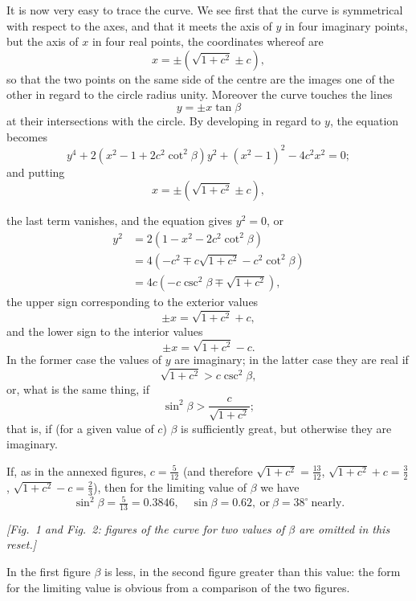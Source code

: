 \documentclass[11pt,a4paper]{article}
\theoremstyle{plain}
\begin{document}
It is now very easy to trace the curve. We see first that the curve is symmetrical with respect to the axes, and that it meets the axis of $y$ in four imaginary points, but the axis of $x$ in four real points, the coordinates whereof are
\[
x = \pm(\sqrt{1 + c^2} \pm c),
\]
so that the two points on the same side of the centre are the images one of the other in regard to the circle radius unity. Moreover the curve touches the lines
\[
y = \pm x\tan\beta
\]
at their intersections with the circle. By developing in regard to $y$, the equation becomes
\[
y^4 + 2(x^2 - 1 + 2c^2\cot^2\beta)y^2 + (x^2 - 1)^2 - 4c^2 x^2 = 0;
\]
and putting
\[
x = \pm(\sqrt{1 + c^2} \pm c),
\]

\newpage
\noindent the last term vanishes, and the equation gives $y^2 = 0$, or
\begin{align*}
y^2 &= 2(1 - x^2 - 2c^2\cot^2\beta) \\
    &= 4(-c^2 \mp c\sqrt{1 + c^2} - c^2\cot^2\beta) \\
    &= 4c(-c\csc^2\beta \mp \sqrt{1 + c^2}),
\end{align*}
the upper sign corresponding to the exterior values
\[
\pm x = \sqrt{1 + c^2} + c,
\]
and the lower sign to the interior values
\[
\pm x = \sqrt{1 + c^2} - c.
\]
In the former case the values of $y$ are imaginary; in the latter case they are real if
\[
\sqrt{1 + c^2} > c\csc^2\beta,
\]
or, what is the same thing, if
\[
\sin^2\beta > \frac{c}{\sqrt{1 + c^2}};
\]
that is, if (for a given value of $c$) $\beta$ is sufficiently great, but otherwise they are imaginary.

If, as in the annexed figures, $c = \tfrac{5}{12}$ (and therefore $\sqrt{1 + c^2} = \tfrac{13}{12}$, $\sqrt{1 + c^2} + c = \tfrac{3}{2}$, $\sqrt{1 + c^2} - c = \tfrac{2}{3}$), then for the limiting value of $\beta$ we have
\[
\sin^2\beta = \tfrac{5}{13} = 0.3846,\quad \sin\beta = 0.62,\ \text{or}\ \beta = 38^\circ\ \text{nearly}.
\]

\begin{center}
\textit{[Fig.~1 and Fig.~2: figures of the curve for two values of $\beta$ are omitted in this reset.]}
\end{center}

In the first figure $\beta$ is less, in the second figure greater than this value: the form for the limiting value is obvious from a comparison of the two figures.
\end{document}
